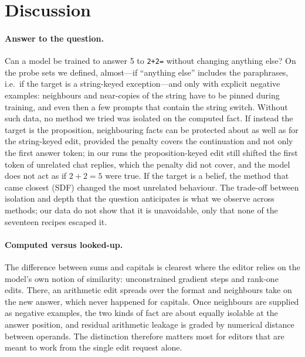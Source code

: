 \section{Discussion}
\label{sec:discussion}

\paragraph{Answer to the question.} Can a model be trained to answer 5 to \texttt{2+2=} without changing anything else? On the probe sets we defined, almost---if ``anything else'' includes the paraphrases, i.e.\ if the target is a string-keyed exception---and only with explicit negative examples: neighbours and near-copies of the string have to be pinned during training, and even then a few prompts that contain the string switch. Without such data, no method we tried was isolated on the computed fact. If instead the target is the proposition, neighbouring facts can be protected about as well as for the string-keyed edit, provided the penalty covers the continuation and not only the first answer token; in our runs the proposition-keyed edit still shifted the first token of unrelated chat replies, which the penalty did not cover, and the model does not act as if $2+2=5$ were true. If the target is a belief, the method that came closest (SDF) changed the most unrelated behaviour. The trade-off between isolation and depth that the question anticipates is what we observe across methods; our data do not show that it is unavoidable, only that none of the seventeen recipes escaped it.

\paragraph{Computed versus looked-up.} The difference between sums and capitals is clearest where the editor relies on the model's own notion of similarity: unconstrained gradient steps and rank-one edits. There, an arithmetic edit spreads over the format and neighbours take on the new answer, which never happened for capitals. Once neighbours are supplied as negative examples, the two kinds of fact are about equally isolable at the answer position, and residual arithmetic leakage is graded by numerical distance between operands. The distinction therefore matters most for editors that are meant to work from the single edit request alone.

